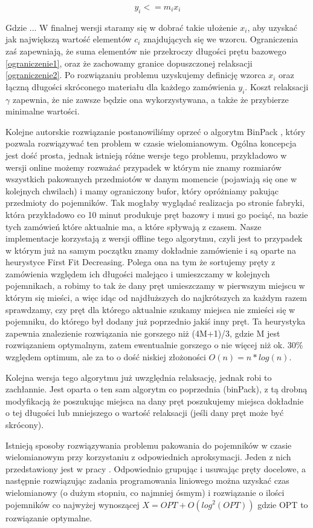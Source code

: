\begin{displaymath}
 y_i <= m_i x_i
\label{ograniczenie2}
\end{displaymath}

Gdzie ...
W finalnej wersji staramy się w dobrać takie ułożenie \(x_i\), aby uzyskać jak największą wartość elementów \(c_i\) znajdujących się we wzorcu. Ograniczenia zaś zapewniają, że suma elementów nie przekroczy długości prętu bazowego \ref{ograniczenie1}, oraz że zachowamy granice dopuszczonej relaksacji \ref{ograniczenie2}. Po rozwiązaniu problemu uzyskujemy definicję wzorca \(x_i\) oraz łączną długości skróconego materiału dla każdego zamówienia \(y_i\). Koszt relaksacji \(\gamma\) zapewnia, że nie zawsze będzie ona wykorzystywana, a także że przybierze minimalne wartości.
 
Kolejne autorskie rozwiązanie postanowiliśmy oprzeć o algorytm BinPack \cite{bin-packing}, który pozwala rozwiązywać ten problem w czasie wielomianowym. Ogólna koncepcja jest dość prosta, jednak istnieją różne wersje tego problemu, przykładowo w wersji online możemy rozważać przypadek w którym nie znamy rozmiarów wszystkich pakowanych przedmiotów w danym momencie (pojawiają się one w kolejnych chwilach) i mamy ograniczony bufor, który opróżniamy pakując przedmioty do pojemników. Tak mogłaby wyglądać realizacja po stronie fabryki, która przykładowo co 10 minut produkuje pręt bazowy i musi go pociąć, na bazie tych zamówień które aktualnie ma, a które spływają z czasem. Nasze implementacje korzystają z wersji offline tego algorytmu, czyli jest to przypadek w którym już na samym początku znamy dokładnie zamówienie i są oparte na heurystyce First Fit Decreasing. Polega ona na tym że sortujemy pręty z zamówienia względem ich długości malejąco i umieszczamy w kolejnych pojemnikach, a robimy to tak że dany pręt umieszczamy w pierwszym miejscu w którym się mieści, a więc idąc od najdłuższych do najkrótszych za każdym razem sprawdzamy, czy pręt dla którego aktualnie szukamy miejsca nie zmieści się w pojemniku, do którego był dodany już poprzednio jakiś inny pręt. Ta heurystyka zapewnia znalezienie rozwiązania nie gorszego niż (4M+1)/3, gdzie M jest rozwiązaniem optymalnym, zatem ewentualnie gorszego o nie więcej niż ok. 30\% względem optimum, ale za to o dość niskiej złożoności $O(n) = n * log(n)$.

Kolejna wersja tego algorytmu już uwzględnia relaksację, jednak robi to zachłannie. Jest oparta o ten sam algorytm co poprzednia (binPack), z tą drobną modyfikacją że poszukując miejsca na dany pręt poszukujemy miejsca dokładnie o tej długości lub mniejszego o wartość relaksacji (jeśli dany pręt może być skrócony).

Istnieją sposoby rozwiązywania problemu pakowania do pojemników w czasie wielomianowym przy korzystaniu z odpowiednich aproksymacji. Jeden z nich przedstawiony jest w pracy \cite{bin-packing}. Odpowiednio grupując i usuwając pręty docelowe, a następnie rozwiązując zadania programowania liniowego można uzyskać czas wielomianowy (o dużym stopniu, co najmniej ósmym) i rozwiązanie o ilości pojemników co najwyżej wynoszącej $X = OPT + O(log^2(OPT))$ gdzie OPT to rozwiązanie optymalne.
